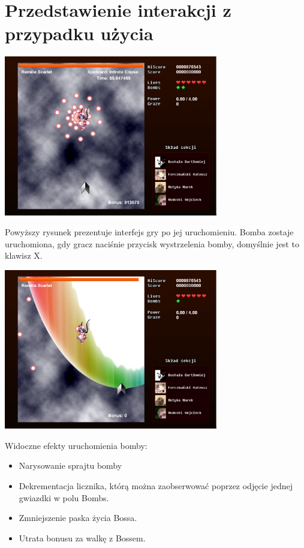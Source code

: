 \documentclass[a4paper,twoside]{article}
\begin{document}
		\section{Przedstawienie interakcji z przypadku użycia}
			\begin{center}
				\includegraphics[width=0.70\textwidth]{./images/sz1}
			\end{center}
			Powyższy rysunek prezentuje interfejs gry po jej uruchomieniu. Bomba zostaje uruchomiona, gdy gracz naciśnie przycisk wystrzelenia bomby, domyślnie jest to klawisz X.
			\begin{center}
				\includegraphics[width=0.70\textwidth]{./images/sz2}
			\end{center}
			Widoczne efekty uruchomienia bomby:
			\begin{itemize}
				\item Narysowanie sprajtu bomby
				\item Dekrementacja licznika, którą można zaobserwować poprzez odjęcie jednej gwiazdki w polu Bombs.
				\item Zmniejszenie paska życia Bossa.
				\item Utrata bonusu za walkę z Bossem.
			\end{itemize}
			
\end{document}

